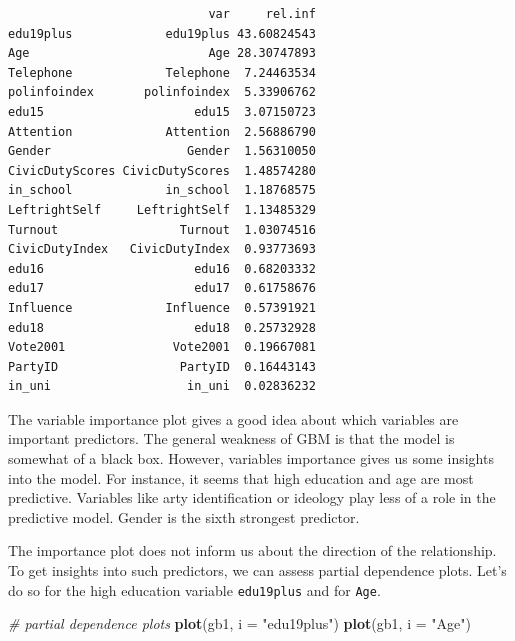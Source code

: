 \documentclass[]{article}
\newenvironment{Shaded}{\begin{snugshade}}{\end{snugshade}}
\newcommand{\CommentTok}[1]{\textcolor[rgb]{0.56,0.35,0.01}{\textit{#1}}}
\newcommand{\DataTypeTok}[1]{\textcolor[rgb]{0.13,0.29,0.53}{#1}}
\newcommand{\KeywordTok}[1]{\textcolor[rgb]{0.13,0.29,0.53}{\textbf{#1}}}
\newcommand{\NormalTok}[1]{#1}
\newcommand{\StringTok}[1]{\textcolor[rgb]{0.31,0.60,0.02}{#1}}
\begin{document}
\begin{verbatim}
                            var     rel.inf
edu19plus             edu19plus 43.60824543
Age                         Age 28.30747893
Telephone             Telephone  7.24463534
polinfoindex       polinfoindex  5.33906762
edu15                     edu15  3.07150723
Attention             Attention  2.56886790
Gender                   Gender  1.56310050
CivicDutyScores CivicDutyScores  1.48574280
in_school             in_school  1.18768575
LeftrightSelf     LeftrightSelf  1.13485329
Turnout                 Turnout  1.03074516
CivicDutyIndex   CivicDutyIndex  0.93773693
edu16                     edu16  0.68203332
edu17                     edu17  0.61758676
Influence             Influence  0.57391921
edu18                     edu18  0.25732928
Vote2001               Vote2001  0.19667081
PartyID                 PartyID  0.16443143
in_uni                   in_uni  0.02836232
\end{verbatim}

The variable importance plot gives a good idea about which variables are important predictors. The general weakness of GBM is that the model is somewhat of a black box. However, variables importance gives us some insights into the model. For instance, it seems that high education and age are most predictive. Variables like arty identification or ideology play less of a role in the predictive model. Gender is the sixth strongest predictor.

The importance plot does not inform us about the direction of the relationship. To get insights into such predictors, we can assess partial dependence plots. Let's do so for the high education variable \texttt{edu19plus} and for \texttt{Age}.

\begin{Shaded}
\begin{Highlighting}[]
\CommentTok{# partial dependence plots}
\KeywordTok{plot}\NormalTok{(gb1, }\DataTypeTok{i =} \StringTok{"edu19plus"}\NormalTok{)}
\KeywordTok{plot}\NormalTok{(gb1, }\DataTypeTok{i =} \StringTok{"Age"}\NormalTok{)}
\end{Highlighting}
\end{Shaded}
\end{document}
